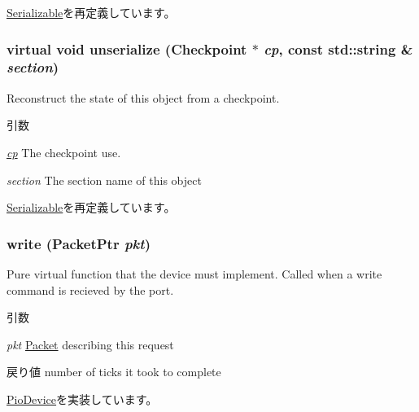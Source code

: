 \hyperlink{classSerializable_ad6272f80ae37e8331e3969b3f072a801}{Serializable}を再定義しています。\hypertarget{classTsunamiIO_af100c4e9feabf3cd918619c88c718387}{
\subsubsection[{unserialize}]{\setlength{\rightskip}{0pt plus 5cm}virtual void unserialize ({\bf Checkpoint} $\ast$ {\em cp}, \/  const std::string \& {\em section})}}
\label{classTsunamiIO_af100c4e9feabf3cd918619c88c718387}
Reconstruct the state of this object from a checkpoint. 
\begin{DoxyParams}{引数}
\item[{\em \hyperlink{namespacecp}{cp}}]The checkpoint use. \item[{\em section}]The section name of this object \end{DoxyParams}


\hyperlink{classSerializable_af100c4e9feabf3cd918619c88c718387}{Serializable}を再定義しています。\hypertarget{classTsunamiIO_a4cefab464e72b5dd42c003a0a4341802}{
\subsubsection[{write}]{ write ({\bf PacketPtr} {\em pkt})}}
\label{classTsunamiIO_a4cefab464e72b5dd42c003a0a4341802}
Pure virtual function that the device must implement. Called when a write command is recieved by the port. 
\begin{DoxyParams}{引数}
\item[{\em pkt}]\hyperlink{classPacket}{Packet} describing this request \end{DoxyParams}
\begin{DoxyReturn}{戻り値}
number of ticks it took to complete 
\end{DoxyReturn}


\hyperlink{classPioDevice_afe8371668d023bb2516b286e5e399b6f}{PioDevice}を実装しています。


